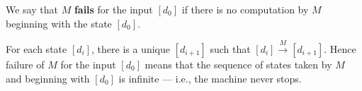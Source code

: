 We say that $M$ \textbf{fails} for the input $[d_0]$ if there is no computation by $M$ beginning with the state $[d_0]$.

For each state $[d_i]$, there is a unique $[d_{i+1}]$ such that $[d_i] \xrightarrow{M} [d_{i+1}]$. Hence failure of $M$ for the input $[d_0]$ means that the sequence of states taken by $M$ and beginning with $[d_0]$ is infinite --- i.e., the machine never stops.
